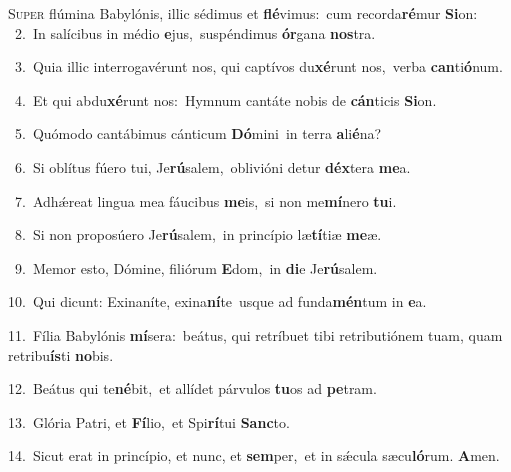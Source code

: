 \lettrine{\initial\textcolor{\initialcolor}{S}}{uper} flúmina Babylónis, illic sédimus et \textbf{flé}\-vimus:~\star cum recorda\-\textbf{ré}\-mur \textbf{Si}\-on:\\
{\numbfont\textcolor{\numbcolor}{~2.}}~In salícibus in médio \textbf{e}\-jus,~\star suspéndimus \textbf{ór}\-gana \textbf{nos}\-tra.\par
{\numbfont\textcolor{\numbcolor}{~3.}}~Quia illic interrogavérunt nos, qui captívos du\-\textbf{xé}\-runt nos,~\star verba \textbf{can}\-ti\-\textbf{ó}\-num.\par
{\numbfont\textcolor{\numbcolor}{~4.}}~Et qui abdu\-\textbf{xé}\-runt nos:~\star Hymnum cantáte nobis de \textbf{cán}\-ticis \textbf{Si}\-on.\par
{\numbfont\textcolor{\numbcolor}{~5.}}~Quómodo cantábimus cánticum \textbf{Dó}\-mini~\star in terra \textbf{a}\-li\-\textbf{é}\-na?\par
{\numbfont\textcolor{\numbcolor}{~6.}}~Si oblítus fúero tui, Je\-\textbf{rú}\-salem,~\star oblivióni detur \textbf{déx}\-tera \textbf{me}\-a.\par
{\numbfont\textcolor{\numbcolor}{~7.}}~Adhǽreat lingua mea fáucibus \textbf{me}\-is,~\star si non me\-\textbf{mí}\-nero \textbf{tu}\-i.\par
{\numbfont\textcolor{\numbcolor}{~8.}}~Si non proposúero Je\-\textbf{rú}\-salem,~\star in princípio læ\-\textbf{tí}\-tiæ \textbf{me}\-æ.\par
{\numbfont\textcolor{\numbcolor}{~9.}}~Memor esto, Dómine, filiórum \textbf{E}\-dom,~\star in \textbf{di}\-e Je\-\textbf{rú}\-salem.\par
{\numbfont\textcolor{\numbcolor}{10.}}~Qui dicunt: Exinaníte, exina\-\textbf{ní}\-te~\star usque ad funda\-\textbf{mén}\-tum in \textbf{e}\-a.\par
{\numbfont\textcolor{\numbcolor}{11.}}~Fília Babylónis \textbf{mí}\-sera:~\star beátus, qui retríbuet tibi retributiónem tuam, quam retribu\-\textbf{ís}\-ti \textbf{no}\-bis.\par
{\numbfont\textcolor{\numbcolor}{12.}}~Beátus qui te\-\textbf{né}\-bit,~\star et allídet párvulos \textbf{tu}\-os ad \textbf{pe}\-tram.\par
{\numbfont\textcolor{\numbcolor}{13.}}~Glória Patri, et \textbf{Fí}\-lio,~\star et Spi\-\textbf{rí}\-tui \textbf{Sanc}\-to.\par
{\numbfont\textcolor{\numbcolor}{14.}}~Sicut erat in princípio, et nunc, et \textbf{sem}\-per,~\star et in sǽcula sæcu\-\textbf{ló}\-rum. \textbf{A}\-men.\par
